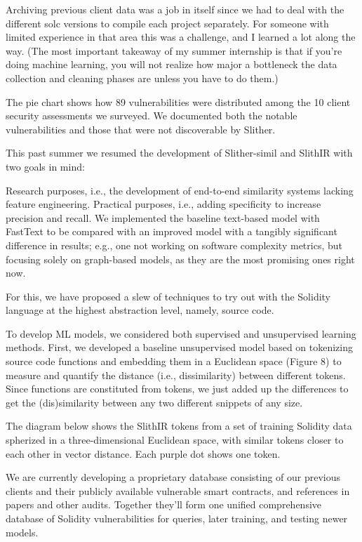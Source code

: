 Archiving previous client data was a job in itself since we had to deal with the different solc versions to compile each project separately.
For someone with limited experience in that area this was a challenge, and I learned a lot along the way. (The most important takeaway of my summer internship is that if you're doing machine learning, you will not realize how major a bottleneck the data collection and cleaning phases are unless you have to do them.)

The pie chart shows how 89 vulnerabilities were distributed among the 10 client security assessments we surveyed.
We documented both the notable vulnerabilities and those that were not discoverable by Slither.

This past summer we resumed the development of Slither-simil and SlithIR with two goals in mind:

Research purposes, i.e., the development of end-to-end similarity systems lacking feature engineering.
Practical purposes, i.e., adding specificity to increase precision and recall.
We implemented the baseline text-based model with FastText to be compared with an improved model with a tangibly significant difference in results; e.g., one not working on software complexity metrics, but focusing solely on graph-based models, as they are the most promising ones right now.

For this, we have proposed a slew of techniques to try out with the Solidity language at the highest abstraction level, namely, source code.

To develop ML models, we considered both supervised and unsupervised learning methods.
First, we developed a baseline unsupervised model based on tokenizing source code functions and embedding them in a Euclidean space (Figure 8) to measure and quantify the distance (i.e., dissimilarity) between different tokens.
Since functions are constituted from tokens, we just added up the differences to get the (dis)similarity between any two different snippets of any size.

The diagram below shows the SlithIR tokens from a set of training Solidity data spherized in a three-dimensional Euclidean space, with similar tokens closer to each other in vector distance.
Each purple dot shows one token.

We are currently developing a proprietary database consisting of our previous clients and their publicly available vulnerable smart contracts, and references in papers and other audits.
Together they'll form one unified comprehensive database of Solidity vulnerabilities for queries, later training, and testing newer models.

